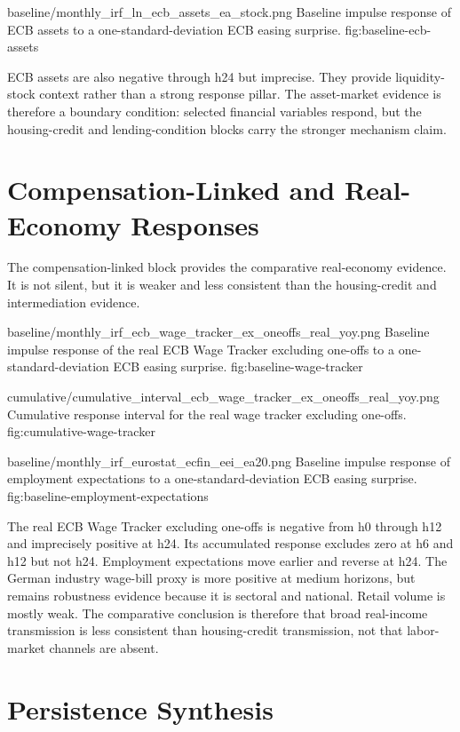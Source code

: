 \thesisfigure
  {baseline/monthly_irf_ln_ecb_assets_ea_stock.png}
  {Baseline impulse response of ECB assets to a one-standard-deviation ECB easing surprise.}
  {fig:baseline-ecb-assets}

ECB assets are also negative through h24 but imprecise. They provide liquidity-stock context rather than a strong response pillar. The asset-market evidence is therefore a boundary condition: selected financial variables respond, but the housing-credit and lending-condition blocks carry the stronger mechanism claim.

\section{Compensation-Linked and Real-Economy Responses}

The compensation-linked block provides the comparative real-economy evidence. It is not silent, but it is weaker and less consistent than the housing-credit and intermediation evidence.

\thesisfigure
  {baseline/monthly_irf_ecb_wage_tracker_ex_oneoffs_real_yoy.png}
  {Baseline impulse response of the real ECB Wage Tracker excluding one-offs to a one-standard-deviation ECB easing surprise.}
  {fig:baseline-wage-tracker}

\thesisfigure
  {cumulative/cumulative_interval_ecb_wage_tracker_ex_oneoffs_real_yoy.png}
  {Cumulative response interval for the real wage tracker excluding one-offs.}
  {fig:cumulative-wage-tracker}

\thesisfigure
  {baseline/monthly_irf_eurostat_ecfin_eei_ea20.png}
  {Baseline impulse response of employment expectations to a one-standard-deviation ECB easing surprise.}
  {fig:baseline-employment-expectations}

The real ECB Wage Tracker excluding one-offs is negative from h0 through h12 and imprecisely positive at h24. Its accumulated response excludes zero at h6 and h12 but not h24. Employment expectations move earlier and reverse at h24. The German industry wage-bill proxy is more positive at medium horizons, but remains robustness evidence because it is sectoral and national. Retail volume is mostly weak. The comparative conclusion is therefore that broad real-income transmission is less consistent than housing-credit transmission, not that labor-market channels are absent.

\section{Persistence Synthesis}

